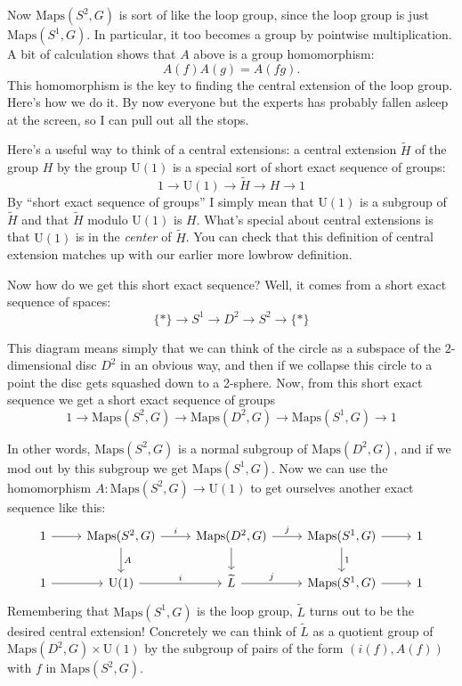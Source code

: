 \documentclass{article}
\begin{document}
Now \(\mathrm{Maps}(S^2,G)\) is sort of like the loop group, since the
loop group is just \(\mathrm{Maps}(S^1,G)\). In particular, it too
becomes a group by pointwise multiplication. A bit of calculation shows
that \(A\) above is a group homomorphism: \[A(f) A(g) = A(fg).\] This
homomorphism is the key to finding the central extension of the loop
group. Here's how we do it. By now everyone but the experts has probably
fallen asleep at the screen, so I can pull out all the stops.

Here's a useful way to think of a central extensions: a central
extension \(\widetilde{H}\) of the group \(H\) by the group
\(\mathrm{U}(1)\) is a special sort of short exact sequence of groups:
\[1 \to \mathrm{U}(1) \to \widetilde{H} \to H \to 1\] By ``short exact
sequence of groups'' I simply mean that \(\mathrm{U}(1)\) is a subgroup
of \(\widetilde{H}\) and that \(\widetilde{H}\) modulo \(\mathrm{U}(1)\)
is \(H\). What's special about central extensions is that
\(\mathrm{U}(1)\) is in the \emph{center} of \(\widetilde{H}\). You can
check that this definition of central extension matches up with our
earlier more lowbrow definition.

Now how do we get this short exact sequence? Well, it comes from a short
exact sequence of spaces: \[\{*\} \to S^1 \to D^2 \to S^2 \to \{*\}\]

This diagram means simply that we can think of the circle as a subspace
of the \(2\)-dimensional disc \(D^2\) in an obvious way, and then if we
collapse this circle to a point the disc gets squashed down to a
2-sphere. Now, from this short exact sequence we get a short exact
sequence of groups
\[1 \to \mathrm{Maps}(S^2,G) \to \mathrm{Maps}(D^2,G) \to \mathrm{Maps}(S^1,G) \to 1\]

In other words, \(\mathrm{Maps}(S^2,G)\) is a normal subgroup of
\(\mathrm{Maps}(D^2,G)\), and if we mod out by this subgroup we get
\(\mathrm{Maps}(S^1,G)\). Now we can use the homomorphism
\(A\colon\mathrm{Maps}(S^2,G)\to \mathrm{U}(1)\) to get ourselves
another exact sequence like this: \[
  \begin{tikzcd}
    1 \rar
    & \mathrm{Maps}(S^2,G)
      \rar["i"] \dar["A"]
    & \mathrm{Maps}(D^2,G)
      \rar["j"] \dar
    & \mathrm{Maps}(S^1,G)
      \rar \dar["1"]
    & 1
  \\1 \rar
    & \mathrm{U}(1)
      \rar["i"]
    & \widetilde{L}
      \rar["j"]
    & \mathrm{Maps}(S^1,G)
      \rar
    & 1
  \end{tikzcd}
\] Remembering that \(\mathrm{Maps}(S^1,G)\) is the loop group,
\(\widetilde{L}\) turns out to be the desired central extension!
Concretely we can think of \(\widetilde{L}\) as a quotient group of
\(\mathrm{Maps}(D^2,G)\times \mathrm{U}(1)\) by the subgroup of pairs of
the form \((i(f),A(f))\) with \(f\) in \(\mathrm{Maps}(S^2,G)\).
\end{document}

